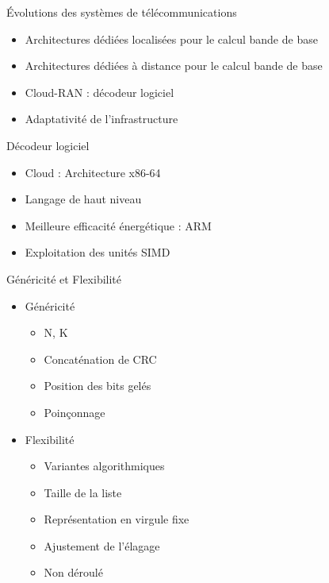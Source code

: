 \documentclass[t,compress,mathserif,12pt,xcolor=dvipsnames]{beamer}
\begin{document}
\begin{frame}[c]{\'Evolutions des systèmes de télécommunications}
	\begin{itemize}
		\item<1-> Architectures dédiées localisées pour le calcul bande de base
		\item<2-> Architectures dédiées à distance pour le calcul bande de base
		\item<3-> Cloud-RAN : décodeur logiciel
		\item<4-> Adaptativité de l'infrastructure
	\end{itemize}
\end{frame}

\begin{frame}[c]{Décodeur logiciel}
	\begin{itemize}
		\item Cloud : Architecture x86-64
		\item Langage de haut niveau
		\item Meilleure efficacité énergétique : ARM
		\item Exploitation des unités SIMD
	\end{itemize}
\end{frame}

\begin{frame}[c]{Généricité et Flexibilité}
	\begin{itemize}
		\item Généricité
		\begin{itemize}
			\item N, K
			\item Concaténation de CRC
			\item Position des bits gelés
			\item Poinçonnage
		\end{itemize}
		\item Flexibilité
		\begin{itemize}
			\item Variantes algorithmiques
			\item Taille de la liste
			\item Représentation en virgule fixe
			\item Ajustement de l'élagage
			\item Non déroulé
		\end{itemize}
	\end{itemize}
\end{frame}
\end{document}
